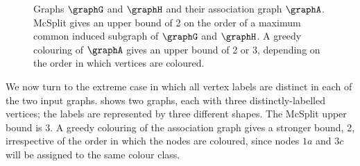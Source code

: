 \begin{figure}[h!]
\centering
{}
\qquad\quad
{}
\qquad\quad
{}
\qquad

\caption{Graphs $\graphG$ and $\graphH$ and their association graph $\graphA$.  McSplit
    gives an upper bound of 2 on the order of a maximum common induced subgraph
    of $\graphG$ and $\graphH$.  A greedy colouring of $\graphA$
    gives an upper bound of 2 or
    3, depending on the order in which vertices are coloured.}
\label{fig:mcsplit-better-bound}
\end{figure}

We now turn to the extreme case in which all vertex labels are distinct
in each of the two input graphs.   shows
two graphs, each with three distinctly-labelled vertices; the labels
are represented by three different shapes.  The McSplit upper bound is 3.
A greedy colouring of the association graph gives a stronger bound, 2,
irrespective of the order in which the nodes are coloured, since
nodes $1a$ and $3c$ will be assigned to the same colour class.

